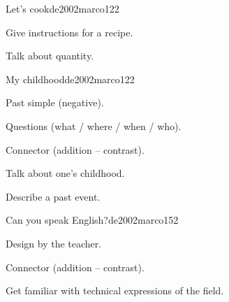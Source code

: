 \begin{syllabus}
\begin{unit}{Let's cook}{}{de2002marco}{12}{2}
   \begin{learningoutcomes}
      \item Give instructions for a recipe.
      \item Talk about quantity.
   \end{learningoutcomes}

\end{unit}

\begin{unit}{My childhood}{}{de2002marco}{12}{2}
   \begin{topics}
      \item Past simple (negative).
      \item Questions (what / where / when / who).
      \item Connector (addition – contrast).
   \end{topics}
   \begin{learningoutcomes}
      \item Talk about one’s childhood.
      \item Describe a past event.
   \end{learningoutcomes}
\end{unit}

\begin{unit}{Can you speak English?}{}{de2002marco}{15}{2}
\begin{topics}
      \item Design by the teacher.
      \item Connector (addition – contrast).
   \end{topics}

   \begin{learningoutcomes}
      \item Get familiar with technical expressions of the field.
   \end{learningoutcomes}

\end{unit}

\begin{coursebibliography}
\end{coursebibliography}

\end{syllabus}
%
